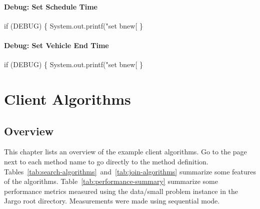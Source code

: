 \subsection{Debug: Set Schedule Time}

\nwenddocs{}\endmoddef\nwstartdeflinemarkup{}\nwenddeflinemarkup
if (DEBUG) \{
  System.out.printf("set bnew[%
\}
\nwendcode{}\nwdocspar

\subsection{Debug: Set Vehicle End Time}

\nwenddocs{}\endmoddef\nwstartdeflinemarkup{}\nwenddeflinemarkup
if (DEBUG) \{
  System.out.printf("set bnew[%
\}
\nwendcode{}\nwdocspar

\nwenddocs{}\part{Client Algorithms}
\label{part-client}

\chapter{Overview}
\label{client-overview}

This chapter lists an overview of the example client algorithms. Go to the page
next to each method name to go directly to the method definition.
Tables~\ref{tab:search-algorithms}~and~\ref{tab:join-algorithms} summarize some
features of the algorithms. Table~\ref{tab:performance-summary} summarize some
performance metrics measured using the {\Tt{}data/small\nwendquote} problem instance in the
Jargo root directory. Measurements were made using sequential mode.

